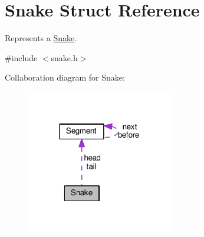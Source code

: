 \hypertarget{structSnake}{}\section{Snake Struct Reference}
\label{structSnake}


Represents a \hyperlink{structSnake}{Snake}.  




{\ttfamily \#include $<$snake.\+h$>$}



Collaboration diagram for Snake\+:
\nopagebreak
\begin{figure}[H]
\begin{center}
\leavevmode
\includegraphics[width=182pt]{structSnake__coll__graph}
\end{center}
\end{figure}
